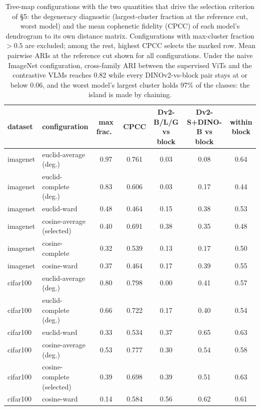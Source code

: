 \begin{table}[H]
\centering
\scriptsize
\setlength{\tabcolsep}{3pt}
\begin{tabular}{llccccc}
\toprule
dataset & configuration & max frac.\ & CPCC & Dv2-B/L/G vs block & Dv2-S+DINO-B vs block & within block \\
\midrule
imagenet & euclid-average (deg.) & 0.97 & 0.761 & 0.03 & 0.08 & 0.64 \\
imagenet & euclid-complete (deg.) & 0.83 & 0.606 & 0.03 & 0.17 & 0.44 \\
imagenet & euclid-ward & 0.48 & 0.464 & 0.15 & 0.38 & 0.53 \\
imagenet & cosine-average (selected) & 0.40 & 0.691 & 0.38 & 0.35 & 0.48 \\
imagenet & cosine-complete & 0.32 & 0.539 & 0.13 & 0.17 & 0.50 \\
imagenet & cosine-ward & 0.37 & 0.464 & 0.17 & 0.39 & 0.55 \\
\midrule
cifar100 & euclid-average (deg.) & 0.80 & 0.798 & 0.00 & 0.41 & 0.57 \\
cifar100 & euclid-complete (deg.) & 0.66 & 0.722 & 0.17 & 0.40 & 0.54 \\
cifar100 & euclid-ward & 0.33 & 0.534 & 0.37 & 0.65 & 0.63 \\
cifar100 & cosine-average (deg.) & 0.53 & 0.777 & 0.30 & 0.54 & 0.58 \\
cifar100 & cosine-complete (selected) & 0.39 & 0.698 & 0.39 & 0.51 & 0.63 \\
cifar100 & cosine-ward & 0.14 & 0.584 & 0.56 & 0.62 & 0.61 \\
\bottomrule
\end{tabular}
\caption{Tree-map configurations with the two quantities that drive the selection criterion of \S5: the degeneracy diagnostic (largest-cluster fraction at the reference cut, worst model) and the mean cophenetic fidelity (CPCC) of each model's dendrogram to its own distance matrix. Configurations with max-cluster fraction $>0.5$ are excluded; among the rest, highest CPCC selects the marked row. Mean pairwise ARIs at the reference cut shown for all configurations. Under the naive ImageNet configuration, cross-family ARI between the supervised ViTs and the contrastive VLMs reaches 0.82 while every DINOv2-vs-block pair stays at or below 0.06, and the worst model's largest cluster holds 97\% of the classes: the island is made by chaining.}
\label{tab:b7-treemapcontrols}
\end{table}
